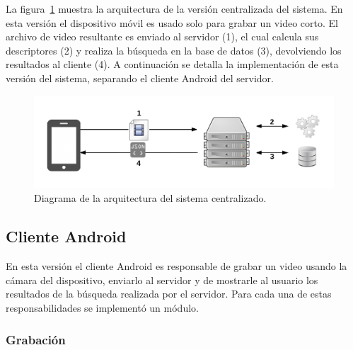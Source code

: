 La figura~\ref{arquitectura_centralizada} muestra la arquitectura de la versión centralizada del sistema. En esta versión el dispositivo móvil es usado solo para grabar un video corto. El archivo de video resultante es enviado al servidor (1), el cual calcula sus descriptores (2) y realiza la búsqueda en la base de datos (3), devolviendo los resultados al cliente (4).
A continuación se detalla la implementación de esta versión del sistema, separando el cliente Android del servidor.
	\begin{figure}[!h]
		\centering
		\includegraphics[scale=1]{imagenes/cap4/arquitectura_centralizada}
		\caption{Diagrama de la arquitectura del sistema centralizado.}
		\label{arquitectura_centralizada}
	\end{figure}
\subsection{Cliente Android}
En esta versión el cliente Android es responsable de grabar un video usando la cámara del dispositivo, enviarlo al servidor y de mostrarle al usuario los resultados de la búsqueda realizada por el servidor. Para cada una de estas responsabilidades se implementó un módulo.

\subsubsection*{Grabación}

